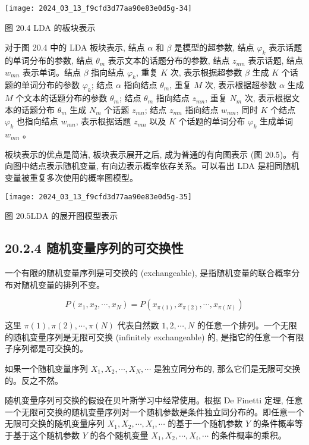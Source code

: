 \documentclass[10pt]{article}
\begin{document}
\begin{CJK*}{UTF8}{bsmi}
\begin{center}
\texttt{[image: 2024\_03\_13\_f9cfd3d77aa90e83e0d5g-34]}
\end{center}

图 20.4 LDA 的板块表示

对于图 20.4 中的 LDA 板块表示, 结点 $\alpha$ 和 $\beta$ 是模型的超参数, 结点 $\varphi_{k}$ 表示话题的单词分布的参数, 结点 $\theta_{m}$ 表示文本的话题分布的参数, 结点 $z_{m n}$ 表示话题, 结点 $w_{m n}$ 表示单词。结点 $\beta$ 指向结点 $\varphi_{k}$, 重复 $K$ 次, 表示根据超参数 $\beta$ 生成 $K$ 个话题的单词分布的参数 $\varphi_{k}$; 结点 $\alpha$ 指向结点 $\theta_{m}$, 重复 $M$ 次, 表示根据超参数 $\alpha$ 生成 $M$ 个文本的话题分布的参数 $\theta_{m}$; 结点 $\theta_{m}$ 指向结点 $z_{m n}$, 重复 $N_{m}$ 次, 表示根据文本的话题分布 $\theta_{m}$ 生成 $N_{m}$ 个话题 $z_{m n}$; 结点 $z_{m n}$ 指向结点 $w_{m n}$, 同时 $K$ 个结点 $\varphi_{k}$ 也指向结点 $w_{m n}$, 表示根据话题 $z_{m n}$ 以及 $K$ 个话题的单词分布 $\varphi_{k}$ 生成单词 $w_{m n}$ 。

板块表示的优点是简洁, 板块表示展开之后, 成为普通的有向图表示 (图 20.5)。有向图中结点表示随机变量, 有向边表示概率依存关系。可以看出 LDA 是相同随机变量被重复多次使用的概率图模型。

\begin{center}
\texttt{[image: 2024\_03\_13\_f9cfd3d77aa90e83e0d5g-35]}
\end{center}

图 $20.5 \mathrm{LDA}$ 的展开图模型表示

\subsection*{20.2.4 随机变量序列的可交换性}
一个有限的随机变量序列是可交换的 (exchangeable), 是指随机变量的联合概率分布对随机变量的排列不变。


\begin{equation*}
P\left(x_{1}, x_{2}, \cdots, x_{N}\right)=P\left(x_{\pi(1)}, x_{\pi(2)}, \cdots, x_{\pi(N)}\right) \tag{20.13}
\end{equation*}


这里 $\pi(1), \pi(2), \cdots, \pi(N)$ 代表自然数 $1,2, \cdots, N$ 的任意一个排列。一个无限的随机变量序列是无限可交换 (infinitely exchangeable) 的, 是指它的任意一个有限子序列都是可交换的。

如果一个随机变量序列 $X_{1}, X_{2}, \cdots, X_{N}, \cdots$ 是独立同分布的, 那么它们是无限可交换的。反之不然。

随机变量序列可交换的假设在贝叶斯学习中经常使用。根据 De Finetti 定理, 任意一个无限可交换的随机变量序列对一个随机参数是条件独立同分布的。即任意一个无限可交换的随机变量序列 $X_{1}, X_{2}, \cdots, X_{i}, \cdots$ 的基于一个随机参数 $Y$ 的条件概率等于基于这个随机参数 $Y$ 的各个随机变量 $X_{1}, X_{2}, \cdots, X_{i}, \cdots$ 的条件概率的乘积。



\end{CJK*}
\end{document}
